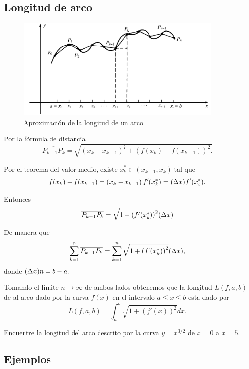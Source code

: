 \subsection{Longitud de arco}


\begin{figure}
 \centering
 \includegraphics[height=5cm,keepaspectratio=true]{./calculo/fig2908.png}
 \caption{Aproximación de la longitud de un arco}
 \label{fig:2908}
\end{figure}




Por la f\'ormula de distancia
$$
\overline{P_{k-1}P_{k}}=\sqrt{
\left( x_{k}-x_{k-1} \right)^{2}+
\left( f(x_{k})-f(x_{k-1}) \right)^{2}.
}
$$


Por el teorema del valor medio, existe $x_{k}^{*}\in(x_{k-1},x_{k})$ tal que
$$
f(x_{k})-f(x_{k-1})=\left( x_{k}-x_{k-1} \right)f'(x_{k}^{*})=(\Delta x)f'(x_{k}^{*}).
$$

Entonces 
$$
\overline{P_{k-1}P_{k}}=\sqrt{1+\left( f'(x_{k}^{*}) \right)^{2}}(\Delta x)
$$



De manera que 
$$
\sum_{k=1}^{n}\overline{P_{k-1}P_{k}}=
\sum_{k=1}^{n}\sqrt{1+\left( f'(x_{k}^{*}) \right)^{2}}(\Delta x),
$$ donde $(\Delta x)n=b-a.$


Tomando el l\'imite $n \to \infty$ de ambos lados obtenemos que la longitud $L(f,a,b)$ de al arco dado por la curva $f(x)$ en el intervalo $a\leq x \leq b$ esta dado por 
\[
 \label{29.2}
 L(f,a,b)=\int_{a}^{b}\sqrt{1+(f'(x))^{2}}dx.
\]




\begin{problema}
 Encuentre la longitud del arco descrito por la curva $y=x^{3/2}$ de $x=0$ a $x=5.$
\end{problema}



\subsection{Ejemplos}

